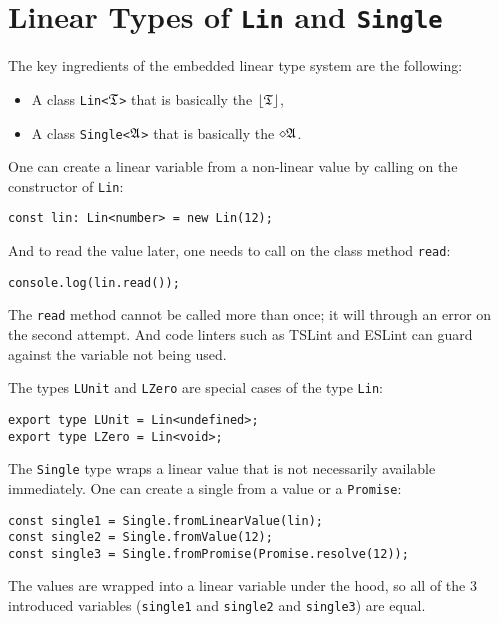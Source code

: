 \section{Linear Types of \texttt{Lin} and \texttt{Single}}

The key ingredients of the embedded linear type system are the following:
\begin{itemize}
    \item A class \texttt{Lin<}$\mathfrak{T}$\texttt{>} that is basically the $\left\lfloor \mathfrak{T} \right\rfloor$,
    \item A class \texttt{Single<}$\mathfrak{A}$\texttt{>} that is basically the $\diamond\mathfrak{A}$.
\end{itemize}

One can create a linear variable from a non-linear value by calling on the constructor of \texttt{Lin}:

\begin{verbatim}
const lin: Lin<number> = new Lin(12);
\end{verbatim}

And to read the value later, one needs to call on the class method \texttt{read}:

\begin{verbatim}
console.log(lin.read());
\end{verbatim}

The \texttt{read} method cannot be called more than once; it will through an error on the second attempt. And code linters such as TSLint and ESLint can guard against the variable not being used.

The types \texttt{LUnit} and \texttt{LZero} are special cases of the type \texttt{Lin}:

\begin{verbatim}
export type LUnit = Lin<undefined>;
export type LZero = Lin<void>;
\end{verbatim}

The \texttt{Single} type wraps a linear value that is not necessarily available immediately. One can create a single from a value or a \texttt{Promise}:

\begin{verbatim}
const single1 = Single.fromLinearValue(lin);
const single2 = Single.fromValue(12);
const single3 = Single.fromPromise(Promise.resolve(12));
\end{verbatim}

The values are wrapped into a linear variable under the hood, so all of the 3 introduced variables (\texttt{single1} and \texttt{single2} and \texttt{single3}) are equal.

